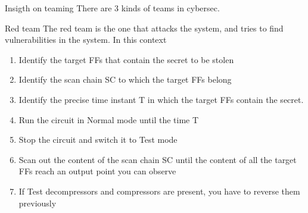 \begin{section}{Insigth on teaming}
  There are 3 kinds of teams in cybersec.
  \begin{subsection}{Red team}
    The red team is the one that attacks the system, and tries to find vulnerabilities in the system.
    In this context 
    \begin{enumerate}
      \item Identify the target FFs that contain the secret to be stolen
      \item Identify the scan chain SC to which the target FFs belong
      \item Identify the precise time instant T in which the target FFs contain the secret.
      \item Run the circuit in Normal mode until the time T
      \item Stop the circuit and switch it to Test mode
      \item Scan out the content of the scan chain SC until the content of all the target FFs reach an output
        point you can observe
      \item If Test decompressors and compressors are present, you have to reverse them previously
    \end{enumerate}

  \end{subsection}

\end{section}
